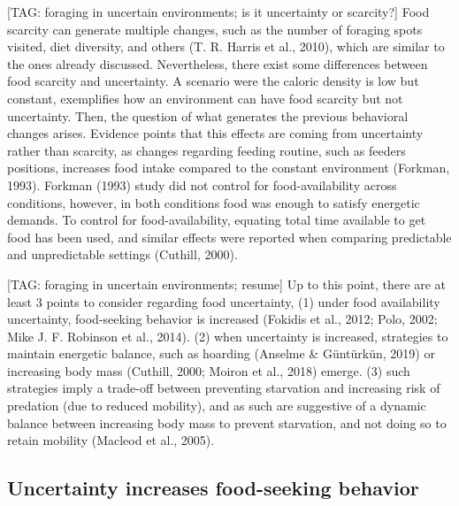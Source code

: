 \documentclass[
]{/home/nicoluarte/Downloads/templates/PNAS-template-main.tex}
\begin{document}
{[}TAG: foraging in uncertain environments; is it uncertainty or
scarcity?{]} Food scarcity can generate multiple changes, such as the
number of foraging spots visited, diet diversity, and others (T. R.
Harris et al., 2010), which are similar to the ones already discussed.
Nevertheless, there exist some differences between food scarcity and
uncertainty. A scenario were the caloric density is low but constant,
exemplifies how an environment can have food scarcity but not
uncertainty. Then, the question of what generates the previous
behavioral changes arises. Evidence points that this effects are coming
from uncertainty rather than scarcity, as changes regarding feeding
routine, such as feeders positions, increases food intake compared to
the constant environment (Forkman, 1993). Forkman (1993) study did not
control for food-availability across conditions, however, in both
conditions food was enough to satisfy energetic demands. To control for
food-availability, equating total time available to get food has been
used, and similar effects were reported when comparing predictable and
unpredictable settings (Cuthill, 2000).

{[}TAG: foraging in uncertain environments; resume{]} Up to this point,
there are at least 3 points to consider regarding food uncertainty, (1)
under food availability uncertainty, food-seeking behavior is increased
(Fokidis et al., 2012; Polo, 2002; Mike J. F. Robinson et al., 2014).
(2) when uncertainty is increased, strategies to maintain energetic
balance, such as hoarding (Anselme \& Güntürkün, 2019) or increasing
body mass (Cuthill, 2000; Moiron et al., 2018) emerge. (3) such
strategies imply a trade-off between preventing starvation and
increasing risk of predation (due to reduced mobility), and as such are
suggestive of a dynamic balance between increasing body mass to prevent
starvation, and not doing so to retain mobility (Macleod et al., 2005).

\hypertarget{uncertainty-increases-food-seeking-behavior}{%
\subsection{Uncertainty increases food-seeking
behavior}\label{uncertainty-increases-food-seeking-behavior}}
\end{document}
